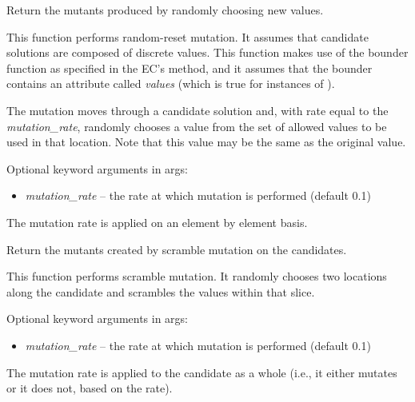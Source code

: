 \documentclass[letterpaper,10pt,english]{sphinxmanual}
\begin{document}
\begin{fulllineitems}
\label{reference:inspyred.ec.variators.random_reset_mutation}
Return the mutants produced by randomly choosing new values.

This function performs random-reset mutation. It assumes that 
candidate solutions are composed of discrete values. This function
makes use of the bounder function as specified in the EC's 
 method, and it assumes that the bounder contains
an attribute called \emph{values} (which is true for instances of
).

The mutation moves through a candidate solution and, with rate
equal to the \emph{mutation\_rate}, randomly chooses a value from the 
set of allowed values to be used in that location. Note that this
value may be the same as the original value.

Optional keyword arguments in args:
\begin{itemize}
\item {} 
\emph{mutation\_rate} -- the rate at which mutation is performed (default 0.1)

\end{itemize}

The mutation rate is applied on an element by element basis.

\end{fulllineitems}


\begin{fulllineitems}
\label{reference:inspyred.ec.variators.scramble_mutation}
Return the mutants created by scramble mutation on the candidates.

This function performs scramble mutation. It randomly chooses two
locations along the candidate and scrambles the values within that
slice.

Optional keyword arguments in args:
\begin{itemize}
\item {} 
\emph{mutation\_rate} -- the rate at which mutation is performed (default 0.1)

\end{itemize}

The mutation rate is applied to the candidate as a whole (i.e., it
either mutates or it does not, based on the rate).

\end{fulllineitems}
\end{document}
